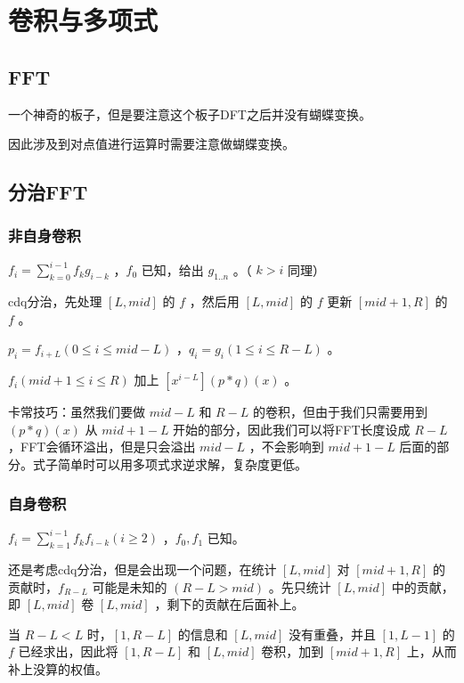 \section{卷积与多项式}

\subsection{FFT}

一个神奇的板子，但是要注意这个板子DFT之后并没有蝴蝶变换。

因此涉及到对点值进行运算时需要注意做蝴蝶变换。



\subsection{分治FFT}

\subsubsection{非自身卷积}

$f_i=\sum_{k=0}^{i-1}f_kg_{i-k}$ ，$f_0$ 已知，给出 $g_{1..n}$ 。（ $k>i$ 同理）

cdq分治，先处理 $[L,mid]$ 的 $f$ ，然后用 $[L,mid]$ 的 $f$ 更新 $[mid+1,R]$ 的 $f$ 。

$p_i=f_{i+L}(0\le i\le mid-L)$ ，$q_i=g_i(1\le i\le R-L)$ 。

$f_i(mid+1\le i\le R)$ 加上 $[x^{i-L}](p*q)(x)$ 。

卡常技巧：虽然我们要做 $mid-L$ 和 $R-L$ 的卷积，但由于我们只需要用到 $(p*q)(x)$ 从 $mid+1-L$ 开始的部分，因此我们可以将FFT长度设成 $R-L$ ，FFT会循环溢出，但是只会溢出 $mid-L$ ，不会影响到 $mid+1-L$ 后面的部分。式子简单时可以用多项式求逆求解，复杂度更低。

\subsubsection{自身卷积}

\vspace{-0.2cm}

$f_i=\sum_{k=1}^{i-1}f_kf_{i-k}(i\ge 2)$ ，$f_0,f_1$ 已知。

还是考虑cdq分治，但是会出现一个问题，在统计 $[L,mid]$ 对 $[mid+1,R]$ 的贡献时，$f_{R-L}$ 可能是未知的 $(R-L>mid)$ 。先只统计 $[L,mid]$ 中的贡献，即 $[L,mid]$ 卷 $[L,mid]$ ，剩下的贡献在后面补上。

当 $R-L<L$ 时，$[1,R-L]$ 的信息和 $[L,mid]$ 没有重叠，并且 $[1,L-1]$ 的 $f$ 已经求出，因此将 $[1,R-L]$ 和 $[L,mid]$ 卷积，加到 $[mid+1,R]$ 上，从而补上没算的权值。

